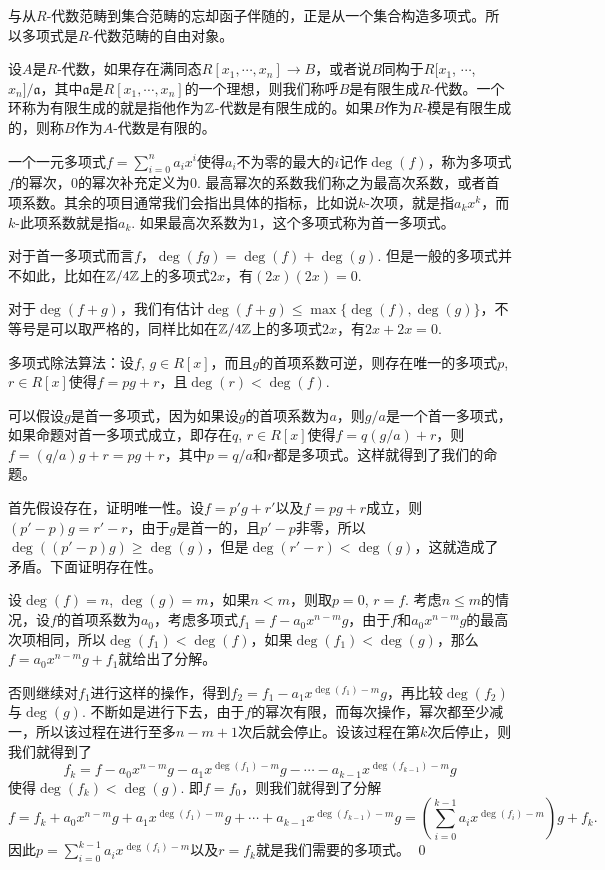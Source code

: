 与从$R$-代数范畴到集合范畴的忘却函子伴随的，正是从一个集合构造多项式。所以多项式是$R$-代数范畴的自由对象。

\para 设$A$是$R$-代数，如果存在满同态$R[x_1,\cdots ,x_n]\to B$，或者说$B$同构于$R[x_1$, $\cdots$, $x_n]/\mathfrak{a}$，其中$\mathfrak{a}$是$R[x_1,\cdots ,x_n]$的一个理想，则我们称呼$B$是有限生成$R$-代数。一个环称为有限生成的就是指他作为$\mathbb{Z}$-代数是有限生成的。如果$B$作为$R$-模是有限生成的，则称$B$作为$A$-代数是有限的。

\para 一个一元多项式$f=\sum_{i=0}^na_ix^i$使得$a_i$不为零的最大的$i$记作$\deg(f)$，称为多项式$f$的幂次，$0$的幂次补充定义为$0$. 最高幂次的系数我们称之为最高次系数，或者首项系数。其余的项目通常我们会指出具体的指标，比如说$k$-次项，就是指$a_kx^k$，而$k$-此项系数就是指$a_k$. 如果最高次系数为$1$，这个多项式称为首一多项式。

对于首一多项式而言$f$，$\deg(fg)=\deg(f)+\deg(g)$. 但是一般的多项式并不如此，比如在$\mathbb{Z}/4\mathbb{Z}$上的多项式$2x$，有$(2x)(2x)=0$.

对于$\deg(f+g)$，我们有估计$\deg(f+g)\leq \max\{\deg(f),\deg(g)\}$，不等号是可以取严格的，同样比如在$\mathbb{Z}/4\mathbb{Z}$上的多项式$2x$，有$2x+2x=0$.

\theo 多项式除法算法：设$f$, $g\in R[x]$，而且$g$的首项系数可逆，则存在唯一的多项式$p$, $r\in R[x]$使得$f=pg+r$，且$\deg(r)<\deg(f)$.

\proof
	可以假设$g$是首一多项式，因为如果设$g$的首项系数为$a$，则$g/a$是一个首一多项式，如果命题对首一多项式成立，即存在$q$, $r\in R[x]$使得$f=q(g/a)+r$，则$f=(q/a)g+r=pg+r$，其中$p=q/a$和$r$都是多项式。这样就得到了我们的命题。

	首先假设存在，证明唯一性。设$f=p'g+r'$以及$f=pg+r$成立，则$(p'-p)g=r'-r$，由于$g$是首一的，且$p'-p$非零，所以$\deg((p'-p)g)\geq \deg(g)$，但是$\deg(r'-r)< \deg(g)$，这就造成了矛盾。下面证明存在性。

	设$\deg(f)=n$, $\deg(g)=m$，如果$n<m$，则取$p=0$, $r=f$. 考虑$n\leq m$的情况，设$f$的首项系数为$a_0$，考虑多项式$f_1=f-a_0x^{n-m}g$，由于$f$和$a_0x^{n-m}g$的最高次项相同，所以$\deg(f_1)<\deg(f)$，如果$\deg(f_1)<\deg(g)$，那么$f=a_0x^{n-m}g+f_1$就给出了分解。

	否则继续对$f_1$进行这样的操作，得到$f_2=f_1-a_1x^{\deg(f_1)-m}g$，再比较$\deg(f_2)$与$\deg(g)$. 不断如是进行下去，由于$f$的幂次有限，而每次操作，幂次都至少减一，所以该过程在进行至多$n-m+1$次后就会停止。设该过程在第$k$次后停止，则我们就得到了
	\[
	f_{k}=f-a_0x^{n-m}g-a_1x^{\deg(f_1)-m}g-\cdots-a_{k-1}x^{\deg(f_{k-1})-m}g
	\]
	使得$\deg(f_k)< \deg(g)$. 即$f=f_0$，则我们就得到了分解
	\[
	f=f_k+a_0x^{n-m}g+a_1x^{\deg(f_1)-m}g+\cdots+a_{k-1}x^{\deg(f_{k-1})-m}g=\left(\sum_{i=0}^{k-1}a_{i}x^{\deg(f_{i})-m}\right)g+f_k.
	\]
	因此$p=\sum_{i=0}^{k-1}a_{i}x^{\deg(f_{i})-m}$以及$r=f_k$就是我们需要的多项式。
\qed

